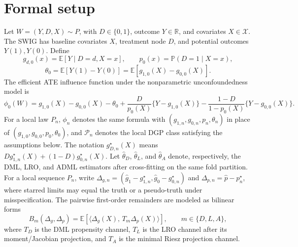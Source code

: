 \documentclass[11pt]{article}
\newcommand{\E}{\mathbb{E}}
\renewcommand{\Pr}{\mathbb{P}}
\newcommand{\R}{\mathbb{R}}
\theoremstyle{definition}
\theoremstyle{plain}
\theoremstyle{remark}
\begin{document}
\section{Formal setup}
Let \(W=(Y,D,X)\sim P\), with \(D\in\{0,1\}\), outcome \(Y\in\R\), and
covariates \(X\in\mathcal{X}\).  The SWIG has baseline covariates \(X\), treatment
node \(D\), and potential outcomes \(Y(1),Y(0)\).  Define
\[
g_{d,0}(x)=\E[Y\mid D=d,X=x],\qquad p_0(x)=\Pr(D=1\mid X=x),
\]
\[
\theta_0=\E[Y(1)-Y(0)]=\E[g_{1,0}(X)-g_{0,0}(X)].
\]
The efficient ATE influence function under the nonparametric unconfoundedness
model is
\[
\phi_0(W)=g_{1,0}(X)-g_{0,0}(X)-\theta_0+
\frac{D}{p_0(X)}\{Y-g_{1,0}(X)\}
-\frac{1-D}{1-p_0(X)}\{Y-g_{0,0}(X)\}.
\]
For a local law \(P_n\), \(\phi_n\) denotes the same formula with
\((g_{1,n},g_{0,n},p_n,\theta_n)\) in place of
\((g_{1,0},g_{0,0},p_0,\theta_0)\), and \(\mathcal{P}_n\) denotes the local DGP
class satisfying the assumptions below.  The notation \(g_{D,n}^\star(X)\)
means \(Dg_{1,n}^\star(X)+(1-D)g_{0,n}^\star(X)\).
Let \(\hat\theta_D\), \(\hat\theta_L\), and \(\hat\theta_A\) denote,
respectively, the DML, LRO, and ADML estimators after cross-fitting on the same
fold partition.  For a local sequence \(P_n\), write
\(\Delta_{g,n}=(\hat g_1-g_{1,n}^\star,\hat g_0-g_{0,n}^\star)\) and
\(\Delta_{p,n}=\hat p-p_n^\star\), where starred limits may equal the truth
or a pseudo-truth under misspecification.  The pairwise first-order remainders
are modeled as bilinear forms
\[
B_m(\Delta_g,\Delta_p)=
\E\!\left[\langle \Delta_g(X),\, T_m\Delta_p(X)\rangle\right],
\qquad m\in\{D,L,A\},
\]
where \(T_D\) is the DML propensity channel, \(T_L\) is the LRO channel after
its moment/Jacobian projection, and \(T_A\) is the minimal Riesz projection
channel.
\end{document}
